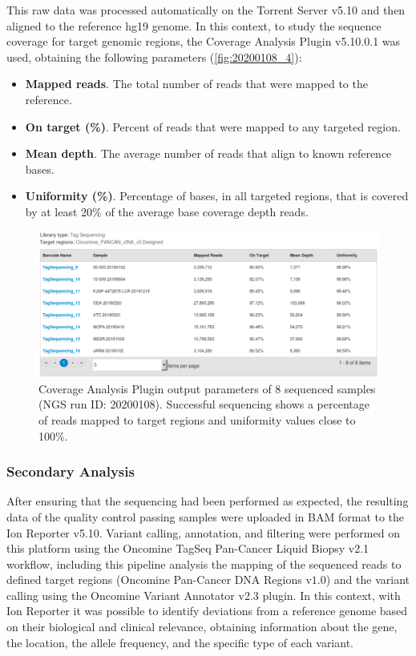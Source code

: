 This raw data was processed automatically on the Torrent Server\texttrademark{} v5.10 and then aligned to the reference hg19 genome. In this context, to study the sequence coverage for target genomic regions, the Coverage Analysis Plugin v5.10.0.1 was used, obtaining the following parameters (\autoref{fig:20200108_4}):
\begin{itemize}
    \item \textbf{Mapped reads}. The total number of reads that were mapped to the reference.
    \item \textbf{On target (\%)}. Percent of reads that were mapped to any targeted region.
    \item \textbf{Mean depth}. The average number of reads that align to known reference bases.
    \item \textbf{Uniformity (\%)}. Percentage of bases, in all targeted regions, that is covered by at least 20\% of the average base coverage depth reads.
\end{itemize}

\begin{figure}[ht]
    \centering
    \includegraphics[width=\textwidth]{Images/chapter_3/20200108/20200108_4.png}
    \caption{Coverage Analysis Plugin output parameters of 8 sequenced samples (NGS run ID: 20200108). Successful sequencing shows a percentage of reads mapped to target regions and uniformity values close to 100\%.}
    \label{fig:20200108_4}
\end{figure}

\subsubsection{Secondary Analysis} \label{Secondary_analysis}

After ensuring that the sequencing had been performed as expected, the resulting data of the quality control passing samples were uploaded in BAM format to the Ion Reporter\texttrademark{} v5.10. Variant calling, annotation, and filtering were performed on this platform using the Oncomine\texttrademark{} TagSeq Pan-Cancer Liquid Biopsy v2.1 workflow, including this pipeline analysis the mapping of the sequenced reads to defined target regions (Oncomine\texttrademark{} Pan-Cancer DNA Regions v$1.0$) and the variant calling using the Oncomine\texttrademark{} Variant Annotator v2.3 plugin. In this context, with Ion Reporter\texttrademark{} it was possible to identify deviations from a reference genome based on their biological and clinical relevance, obtaining information about the gene, the location, the allele frequency, and the specific type of each variant.

